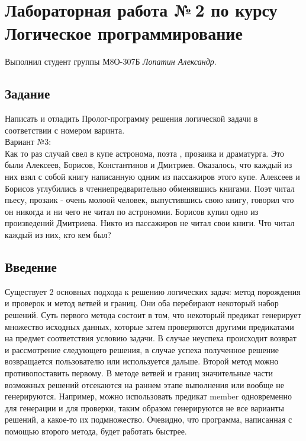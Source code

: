 \documentclass[12pt]{article}
\begin{document}
\section*{Лабораторная работа №\,2 по курсу Логическое программирование}

Выполнил студент группы М8О-307Б \textit{Лопатин Александр}.

\subsection*{Задание}
Написать и отладить Пролог-программу решения логической задачи в соответствии с номером варинта.\\
Вариант №3:\\
Как то раз случай свел в купе астронома, поэта , прозаика и драматурга. Это были Алексеев, Борисов, Константинов и Дмитриев. Оказалось, что каждый из них взял с собой книгу написанную одним из пассажиров этого купе. Алексеев и Борисов углубились в чтениепредварительно обменявшись книгами. Поэт читал пьесу, прозаик - очень молоой человек, выпустившись свою книгу, говорил что он никогда и ни чего не читал по астрономии. Борисов купил одно из произведений Дмитриева. Никто из пассажиров не читал свои книги. Что читал каждый из них, кто кем был?

\subsection*{Введение}

Существует 2 основных подхода к решению логических задач: метод порождения и проверок и метод ветвей и границ. Они оба перебирают некоторый набор решений. Суть первого метода состоит в том, что некоторый предикат генерирует множество исходных данных, которые затем проверяются другими предикатами на предмет соответствия условию задачи. В случае неуспеха происходит возврат и рассмотрение следующего решения, в случае успеха полученное решение возвращается пользователю или используется дальше. Второй метод можно противопоставить первому. В методе ветвей и границ значительные части возможных решений отсекаются на раннем этапе выполнения или вообще не генерируются. Например, можно использовать предикат member одновременно для генерации и для проверки, таким образом генерируются не все варианты решений, а какое-то их подмножество. Очевидно, что программа, написанная с помощью второго метода, будет работать быстрее.
\end{document}
